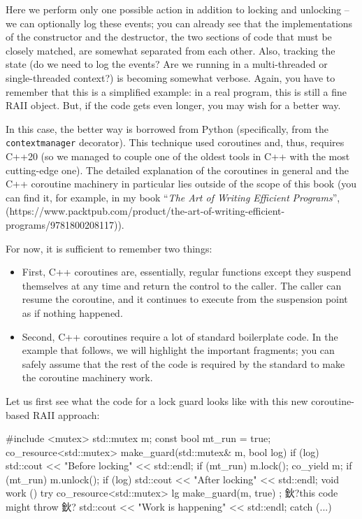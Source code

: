 Here we perform only one possible action in addition to locking and unlocking -- we can optionally log these events; you can already see that the implementations of the constructor and the destructor, the two sections of code that must be closely matched, are somewhat separated from each other. Also, tracking the state (do we need to log the events? Are we running in a multi-threaded or single-threaded context?) is becoming somewhat verbose. Again, you have to remember that this is a simplified example: in a real program, this is still a fine RAII object. But, if the code gets even longer, you may wish for a better way.

In this case, the better way is borrowed from Python (specifically, from the \texttt{contextmanager} decorator). This technique used coroutines and, thus, requires C++20 (so we managed to couple one of the oldest tools in C++ with the most cutting-edge one). The detailed explanation of the coroutines in general and the C++ coroutine machinery in particular lies outside of the scope of this book (you can find it, for example, in my book ``\emph{The Art of Writing Efficient} \emph{Programs}'', (https://www.packtpub.com/product/the-art-of-writing-efficient-programs/9781800208117)).

For now, it is sufficient to remember two things:

\begin{itemize}
\item
  First, C++ coroutines are, essentially, regular functions except they suspend themselves at any time and return the control to the caller. The caller can resume the coroutine, and it continues to execute from the suspension point as if nothing happened.
\item
  Second, C++ coroutines require a lot of standard boilerplate code. In the example that follows, we will highlight the important fragments; you can safely assume that the rest of the code is required by the standard to make the coroutine machinery work.
\end{itemize}

Let us first see what the code for a lock guard looks like with this new coroutine-based RAII approach:

\begin{code}
#include <mutex>
std::mutex m;
const bool mt_run = true;
co_resource<std::mutex> make_guard(std::mutex& m, bool log)
{
  if (log) std::cout << "Before locking" << std::endl;
  if (mt_run) m.lock();
  co_yield m;
  if (mt_run) m.unlock();
  if (log) std::cout << "After locking" << std::endl;
}
void work () {
  try {
    co_resource<std::mutex> lg { make_guard(m, true) };
    鈥?this code might throw 鈥?
    std::cout << "Work is happening" << std::endl;
  } catch (...) {}
}
\end{code}

